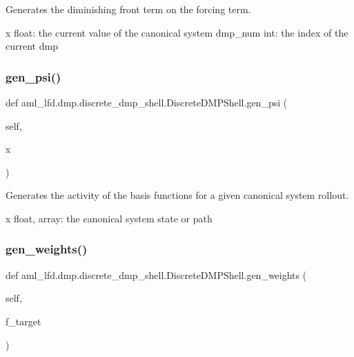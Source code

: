 \begin{DoxyVerb}Generates the diminishing front term on 
the forcing term.

x float: the current value of the canonical system
dmp_num int: the index of the current dmp
\end{DoxyVerb}
 \hypertarget{classaml__lfd_1_1dmp_1_1discrete__dmp__shell_1_1_discrete_d_m_p_shell_a0da4fbcdb74db7ca2d32e5913be72a81}{}\label{classaml__lfd_1_1dmp_1_1discrete__dmp__shell_1_1_discrete_d_m_p_shell_a0da4fbcdb74db7ca2d32e5913be72a81} 
\subsubsection{\texorpdfstring{gen\+\_\+psi()}{gen\_psi()}}
{\footnotesize\ttfamily def aml\+\_\+lfd.\+dmp.\+discrete\+\_\+dmp\+\_\+shell.\+Discrete\+D\+M\+P\+Shell.\+gen\+\_\+psi (\begin{DoxyParamCaption}\item[{}]{self,  }\item[{}]{x }\end{DoxyParamCaption})}

\begin{DoxyVerb}Generates the activity of the basis functions for a given 
canonical system rollout. 

x float, array: the canonical system state or path
\end{DoxyVerb}
 \hypertarget{classaml__lfd_1_1dmp_1_1discrete__dmp__shell_1_1_discrete_d_m_p_shell_a369eaa244df73de31517906315c98772}{}\label{classaml__lfd_1_1dmp_1_1discrete__dmp__shell_1_1_discrete_d_m_p_shell_a369eaa244df73de31517906315c98772} 
\subsubsection{\texorpdfstring{gen\+\_\+weights()}{gen\_weights()}}
{\footnotesize\ttfamily def aml\+\_\+lfd.\+dmp.\+discrete\+\_\+dmp\+\_\+shell.\+Discrete\+D\+M\+P\+Shell.\+gen\+\_\+weights (\begin{DoxyParamCaption}\item[{}]{self,  }\item[{}]{f\+\_\+target }\end{DoxyParamCaption})}

